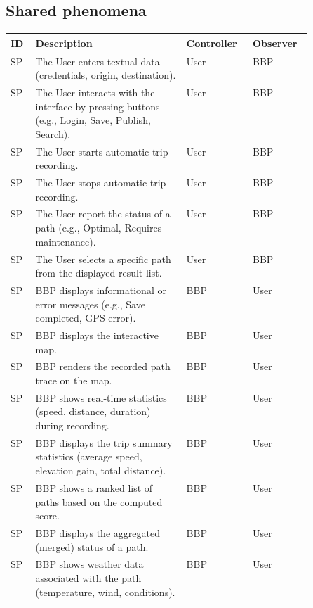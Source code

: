 \subsection{Shared phenomena}
\label{subsec:shared_phenomena}%
\setcounter{sp}{1}
\newcommand{\csp} {\thesp\stepcounter{sp}}
\begin{center}
\begin{footnotesize}
    \begin{longtable}{ |l|p{0.5\linewidth}|l|l|}
        \hline
        \textbf{ID} & \textbf{Description} & \textbf{Controller} & \textbf{Observer} \\
        \hline
        SP\csp  & The User enters textual data (credentials, origin, destination). & User & BBP \\
\hline
    SP\csp  & The User interacts with the interface by pressing buttons (e.g., Login, Save, Publish, Search). & User & BBP \\
    \hline
    SP\csp  & The User starts automatic trip recording. & User & BBP \\
    \hline
    SP\csp  & The User stops automatic trip recording. & User & BBP \\
    \hline
    SP\csp  & The User report the status of a path (e.g., Optimal, Requires maintenance). & User & BBP \\
    \hline
    SP\csp  & The User selects a specific path from the displayed result list. & User & BBP \\
    \hline
    SP\csp  & BBP displays informational or error messages (e.g., Save completed, GPS error). & BBP & User \\
    \hline
    SP\csp  & BBP displays the interactive map. & BBP & User \\
    \hline
    SP\csp  & BBP renders the recorded path trace on the map. & BBP & User \\
    \hline
    SP\csp  & BBP shows real-time statistics (speed, distance, duration) during recording. & BBP & User \\
    \hline
    SP\csp  & BBP displays the trip summary statistics (average speed, elevation gain, total distance). & BBP & User \\
    \hline
    SP\csp  & BBP shows a ranked list of paths based on the computed score. & BBP & User\\
    \hline
    SP\csp  & BBP displays the aggregated (merged) status of a path. & BBP & User \\
    \hline
    SP\csp  & BBP shows weather data associated with the path (temperature, wind, conditions). & BBP & User \\

\end{longtable}
\end{footnotesize}
\end{center}
